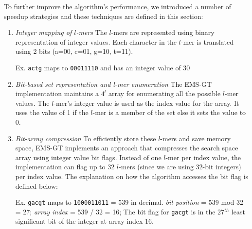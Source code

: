 	To further improve the algorithm's performance, we introduced a number of speedup strategies and these techniques are defined in this section:

	\bigskip

	\begin{enumerate}[label={\em \arabic*.}]

		\item{\em Integer mapping of $l$-mers} \newline
			The $l$-mers are represented using binary representation of integer values. Each character in the $l$-mer is translated using 2 bits (a=00, c=01, g=10, t=11). \newline

			{\small Ex.	\texttt{actg} maps to \texttt{00011110} and has an integer value of 30} \newline

		\item{\em Bit-based set representation and l-mer enumeration} \newline
			The EMS-GT implementation maintains a $4^l$ array for enumerating all the possible $l$-mer values. The $l$-mer's integer value is used as the index value for the array. It uses the value of 1 if the $l$-mer is a member of the set else it sets the value to 0.

			\bigskip

		\item{\em Bit-array compression}\newline
			To efficiently store these $l$-mers and save memory space, EMS-GT implements an approach that compresses the search space array using integer value bit flags. Instead of one $l$-mer per index value, the implementation can flag up to 32 $l$-mers (since we are using 32-bit integers) per index value. The explanation on how the algorithm accesses the bit flag is defined below: \newline

			{\small Ex. \texttt{gacgt} maps to \texttt{1000011011} = 539 in decimal.\newline
				\hspace*{18pt} \emph{bit position} = 539 mod 32 = 27;\newline
				\hspace*{18pt} \emph{array index}  = 539 / 32 = 16;\newline
				\hspace*{18pt} The bit flag for \texttt{gacgt} is in the 27$^{th}$ least significant bit\newline
				\hspace*{18pt} of the integer at array index 16.}


\end{enumerate}

